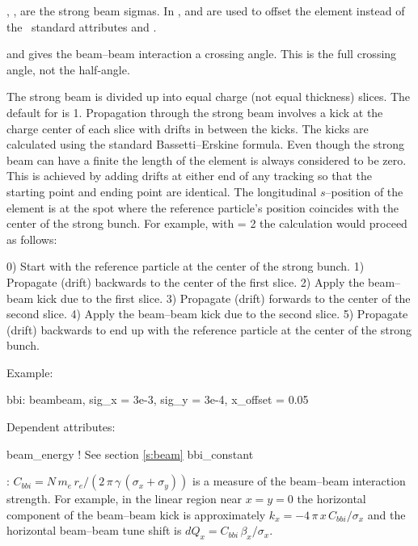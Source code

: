 , ,  are the strong beam sigmas. 
In \bmad,  and  are used to offset the
 element instead of the \mad\ standard attributes
 and .

 and  gives the beam--beam interaction a
crossing angle. This is the full crossing angle, not the half-angle.

The strong beam is divided up into  equal charge (not equal
thickness) slices. The default for  is 1. Propagation
through the strong beam involves a kick at the charge center of each
slice with drifts in between the kicks. The kicks are calculated using
the standard Bassetti--Erskine formula.  Even though the strong beam can
have a finite  the length of the element is always considered
to be zero. This is achieved by adding drifts at either end of any
tracking so that the starting point and ending point are
identical. The longitudinal $s$--position of the
 element is at the spot where the reference particle's
position coincides with the center of the strong bunch. For example,
with  = 2 the calculation would proceed as follows:
\begin{example}
  0) Start with the reference particle at the center of the strong bunch.
  1) Propagate (drift) backwards to the center of the first slice.
  2) Apply the beam--beam kick due to the first slice.
  3) Propagate (drift) forwards to the center of the second slice.
  4) Apply the beam--beam kick due to the second slice.
  5) Propagate (drift) backwards to end up with the reference particle
     at the center of the strong bunch.
\end{example}

\vskip0.05in \noindent
Example:
\begin{example}
  bbi: beambeam, sig\_x = 3e-3, sig\_y = 3e-4, x\_offset = 0.05
\end{example}

\vskip0.05in \noindent
Dependent attributes:
\begin{example}
  beam\_energy  ! See section \ref{s:beam}
  bbi\_constant 
\end{example}
: $ C_{bbi} = 
N \, m_e \, r_e / (2 \, \pi \, \gamma \, (\sigma_x + \sigma_y))$ 
is a measure of the beam--beam interaction strength. For example,
in the linear region near $x = y = 0$ the horizontal component of the
beam--beam kick is approximately 
$k_x = -4\, \pi \, x \, C_{bbi} / \sigma_x$ and the
horizontal beam--beam tune shift is 
$dQ_x = C_{bbi} \, \beta_x / \sigma_x$.

